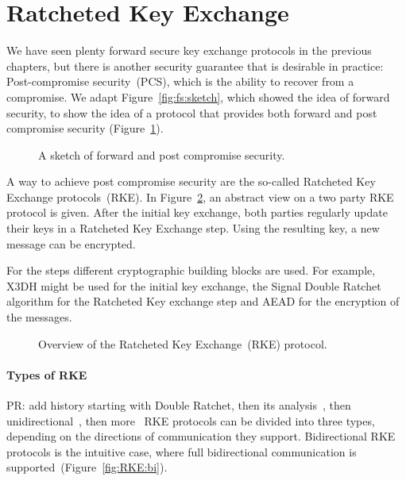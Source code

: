 \section{Ratcheted Key Exchange}
\label{sec:rke}

We have seen plenty forward secure key exchange protocols in the previous chapters, but there is another security guarantee that is desirable in practice:
Post-compromise security~(PCS), which is the ability to recover from a compromise.
We adapt Figure~\ref{fig:fs:sketch}, which showed the idea of forward security, to show the idea of a protocol that provides both forward and post compromise security (Figure~\ref{fig:rke:pcs_fs_overview}).

\begin{figure}[!ht]
    \centering
    
    \caption{A sketch of forward and post compromise security.}
    \label{fig:rke:pcs_fs_overview}
\end{figure}

A way to achieve post compromise security are the so-called Ratcheted Key Exchange protocols~(RKE).
In Figure~\ref{fig:rke:overview}, an abstract view on a two party RKE protocol is given.
After the initial key exchange, both parties regularly update their keys in a Ratcheted Key Exchange step.
Using the resulting key, a new message can be encrypted.

For the steps different cryptographic building blocks are used.
For example, X3DH might be used for the initial key exchange, the Signal Double Ratchet algorithm for the Ratcheted Key exchange step and AEAD for the encryption of the messages.

\begin{figure}[!ht]
    \centering
    
    \caption{Overview of the Ratcheted Key Exchange~(RKE) protocol.}
    \label{fig:rke:overview}
\end{figure}

\paragraph{Types of RKE}
\alert{PR: add history starting with Double Ratchet, then its analysis~\cite{JC:CCDGS20}, then unidirectional~\cite{C:BSJNS17}, then more~\cite{C:PoeRos18}}
RKE protocols can be divided into three types, depending on the directions of communication they support.
Bidirectional RKE protocols is the intuitive case, where full bidirectional communication is supported~(Figure~\ref{fig:RKE:bi}).

